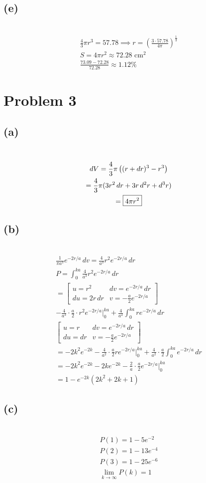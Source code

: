 \documentclass[12pt]{article}
\newcommand*{\paren}[1]{\ensuremath\left(#1\right)}
\newcommand{\at}{\Big|}
\newcommand{\problem}[1]{\section{Problem #1}}
\newcommand{\subproblem}[1]{\subsection{(#1)} \,}
\begin{document}
\subproblem{e}
\begin{gather*}
    \frac{4}{3}\pi r^3 = 57.78 \implies r = \left(\frac{3 \cdot 57.78}{4\pi}\right)^{\frac{1}{3}}\\
    S = 4\pi r^2 \approx 72.28 \text{ cm}^2\\
    \frac{73.09 - 72.28}{72.28} \approx 1.12\%
\end{gather*}

\problem{3}

\subproblem{a}
\begin{gather*}
    d V=\frac{4}{3}\pi  \paren{ (r+dr)^3 -r^3} \\
    =\frac{4}{3}\pi (3r^2\, dr+3r\, d^2r + d^3r)\\
    = \boxed{4\pi r^2}
\end{gather*}

\subproblem{b}
\begin{gather*}
    \frac{1}{\pi a^3} e^{-2r/a} \, dv = \frac{4}{a^3}r^2 e^{-2r/a} \, dr\\
    P= \int_0^{ka} \frac{4}{a^3}r^2 e^{-2r/a} \, dr\\
    = \begin{bmatrix}
        u=r^2 & dv = e^{-2r/a} \, dr\\
        du=2r\, dr & v= -\frac{a}{2}e^{-2r/a}
    \end{bmatrix}\\
    - \frac{4}{a^3} \cdot \frac{a}{2}\cdot r^2 e^{-2r/a} \at^{ka}_0 + \frac{4}{a^2} \int_0^{ka}  r e^{-2r/a}\, dr\\
    \begin{bmatrix}
        u=r & dv = e^{-2r/a} \, dr\\
        du= dr & v= -\frac{a}{2}e^{-2r/a}
    \end{bmatrix}\\
    = - 2k^2 e^{-2k}  - \frac{4}{a^2} \cdot \frac{a}{2} re^{-2r/a}\at_0^{ka} +\frac{4}{a^2} \cdot \frac{a}{2} \int_0^{ka} e^{-2r/a} \, dr\\
    =- 2k^2 e^{-2k}  - 2k e^{-2k} - \frac{2}{a} \cdot \frac{a}{2} e^{-2r/a} \at_0^{ka}\\
    =\boxed{1-e^{-2k}(2k^2+2k+1)}
\end{gather*}

\subproblem{c}
\begin{gather*}
    P(1)=1-5e^{-2}\\
    P(2)=1-13e^{-4}\\
    P(3)=1-25e^{-6}\\
    \lim_{k \to \infty} P(k) =1
\end{gather*}
\end{document}
